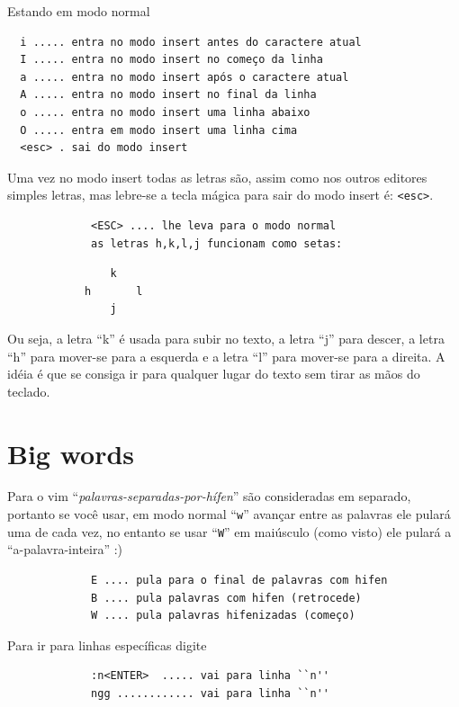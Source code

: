 \documentclass[10pt,a4paper,openany]{book}
\begin{document}
Estando em modo normal

\begin{verbatim}
  i ..... entra no modo insert antes do caractere atual
  I ..... entra no modo insert no começo da linha
  a ..... entra no modo insert após o caractere atual
  A ..... entra no modo insert no final da linha
  o ..... entra no modo insert uma linha abaixo
  O ..... entra em modo insert uma linha cima
  <esc> . sai do modo insert
\end{verbatim}

Uma vez no modo insert todas as letras são, assim como nos outros
editores simples letras, mas lebre-se a tecla mágica para sair do modo
insert é: \verb+<esc>+.

\begin{verbatim}
			 <ESC> .... lhe leva para o modo normal
			 as letras h,k,l,j funcionam como setas:
\end{verbatim}

\begin{verbatim}
				k
			h		l
				j
\end{verbatim}

Ou seja, a letra ``k'' é usada para subir no texto, a letra ``j'' para
descer, a letra ``h'' para mover-se para a esquerda e a letra ``l''
para mover-se para a direita. A idéia é que se consiga ir para
qualquer lugar do texto sem tirar as mãos do teclado.



\section{Big words}
\label{Big word's}

Para o vim ``{\em{palavras-separadas-por-hífen}}'' são consideradas em separado, portanto se você usar,
em modo normal ``\verb+w+'' avançar entre as palavras ele pulará uma de
cada vez, no entanto se usar ``\verb+W+''
em maiúsculo (como visto) ele pulará a ``a-palavra-inteira'' :)

\begin{verbatim}
			 E .... pula para o final de palavras com hifen
			 B .... pula palavras com hifen (retrocede)
			 W .... pula palavras hifenizadas (começo)
\end{verbatim}



Para ir para linhas específicas digite

\begin{verbatim}
			 :n<ENTER>  ..... vai para linha ``n''
			 ngg ............ vai para linha ``n''
\end{verbatim}
\end{document}
